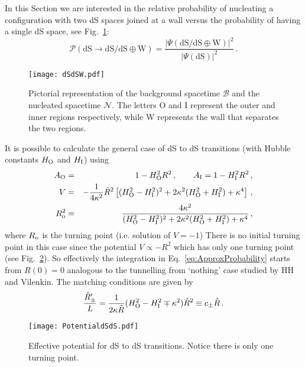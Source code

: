 \documentclass[11pt,a4paper]{article}
\begin{document}
In this Section we are interested in the relative probability of nucleating a configuration with two dS spaces joined at a wall versus the probability of having a single dS space, see Fig.~\ref{fig:dSdSdSW}:
\begin{equation}
\mathcal{P}(\text{dS} \rightarrow \text{dS}/\text{dS} \oplus \text{W}) = \frac{|\Psi(\text{dS}/\text{dS} \oplus \text{W})|^{2}}{|\Psi(\text{dS})|^{2}} \,.
\end{equation}
\begin{figure}[h!] 
\begin{center} 
\texttt{[image: dSdSW.pdf]} 
\caption{\footnotesize{Pictorial representation of the background spacetime $\mathcal{B}$ and the nucleated spacetime $\mathcal{N}$. The letters O and I represent the outer and inner regions respectively, while W represents the wall that separates the two regions.\label{fig:dSdSdSW}}}
\end{center} 
\end{figure}
It is possible to calculate the general case of dS to dS transitions (with Hubble constants $H_{{\rm O}}$ and $H_{\rm I}$) using
\begin{eqnarray}
A_{{\rm O}} & = & 1-H_{{\rm O}}^{2}R^{2}\,,\qquad A_{{\rm I}}=1-H_{{\rm
I}}^{2}R^{2}\,,\label{eq:AOIHH}\\
V & = & -\frac{1}{4\kappa^{2}}\hat{R}^{2}\left[(H_{{\rm O}}^{2}-H_{{\rm
I}}^{2})^{2}+2\kappa^{2}(H_{{\rm O}}^{2}+H_{{\rm
I}}^{2})+\kappa^{4}\right]\,,\label{eq:VHH}\\
R_{\rm o}^{2} & = & \frac{4\kappa^{2}}{(H_{{\rm O}}^{2}-H_{{\rm
I}}^{2})^{2}+2\kappa^{2}(H_{{\rm O}}^{2}+H_{{\rm
I}}^{2})+\kappa^{4}}\,,\label{eq:RoHH}
\end{eqnarray}
where $R_{\rm o}$ is the turning point (i.e. solution of $V=-1$) There is no initial turning point in this case since the potential $V\propto -R^2$ which has only one turning point (see Fig.~\ref{fig:PotentialdStodS}). So effectively the integration in Eq.~\eqref{eq:ApproxProbability}
starts from $R(0)=0$ analogous to the tunnelling from `nothing' case studied by HH and Vilenkin. The matching conditions are given by
\begin{equation}
\frac{\hat{R}'_{\pm}}{L}=\frac{1}{2\kappa\hat{R}}(H_{{\rm O}}^{2}-H_{{\rm
I}}^{2}\mp\kappa^{2})\hat{R}^{2}\equiv c_{\pm}\hat{R} \,.\label{eq:R'HH}
\end{equation}
\begin{figure}[h!] 
\begin{center} 
\texttt{[image: PotentialdSdS.pdf]} 
\caption{\footnotesize{Effective potential for dS to dS transitions. Notice there is only one turning point.\label{fig:PotentialdStodS}}}
\end{center} 
\end{figure} 
\end{document}
